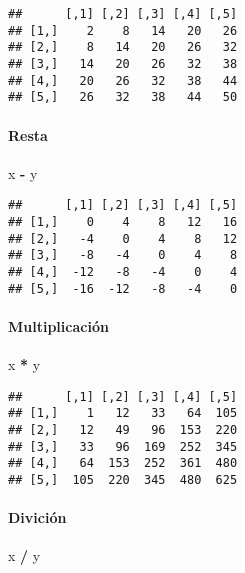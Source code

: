 \documentclass[11pt,]{article}
\newenvironment{Shaded}{\begin{snugshade}}{\end{snugshade}}
\newcommand{\NormalTok}[1]{#1}
\newcommand{\OperatorTok}[1]{\textcolor[rgb]{0.81,0.36,0.00}{\textbf{#1}}}
\newcommand{\StringTok}[1]{\textcolor[rgb]{0.31,0.60,0.02}{#1}}
\begin{document}
\begin{verbatim}
##      [,1] [,2] [,3] [,4] [,5]
## [1,]    2    8   14   20   26
## [2,]    8   14   20   26   32
## [3,]   14   20   26   32   38
## [4,]   20   26   32   38   44
## [5,]   26   32   38   44   50
\end{verbatim}

\hypertarget{resta}{%
\paragraph{Resta}\label{resta}}

\begin{Shaded}
\begin{Highlighting}[]
\NormalTok{x }\OperatorTok{-}\StringTok{ }\NormalTok{y}
\end{Highlighting}
\end{Shaded}

\begin{verbatim}
##      [,1] [,2] [,3] [,4] [,5]
## [1,]    0    4    8   12   16
## [2,]   -4    0    4    8   12
## [3,]   -8   -4    0    4    8
## [4,]  -12   -8   -4    0    4
## [5,]  -16  -12   -8   -4    0
\end{verbatim}

\hypertarget{multiplicaciuxf3n}{%
\paragraph{Multiplicación}\label{multiplicaciuxf3n}}

\begin{Shaded}
\begin{Highlighting}[]
\NormalTok{x }\OperatorTok{*}\StringTok{ }\NormalTok{y}
\end{Highlighting}
\end{Shaded}

\begin{verbatim}
##      [,1] [,2] [,3] [,4] [,5]
## [1,]    1   12   33   64  105
## [2,]   12   49   96  153  220
## [3,]   33   96  169  252  345
## [4,]   64  153  252  361  480
## [5,]  105  220  345  480  625
\end{verbatim}

\hypertarget{diviciuxf3n}{%
\paragraph{Divición}\label{diviciuxf3n}}

\begin{Shaded}
\begin{Highlighting}[]
\NormalTok{x }\OperatorTok{/}\StringTok{ }\NormalTok{y}
\end{Highlighting}
\end{Shaded}
\end{document}
